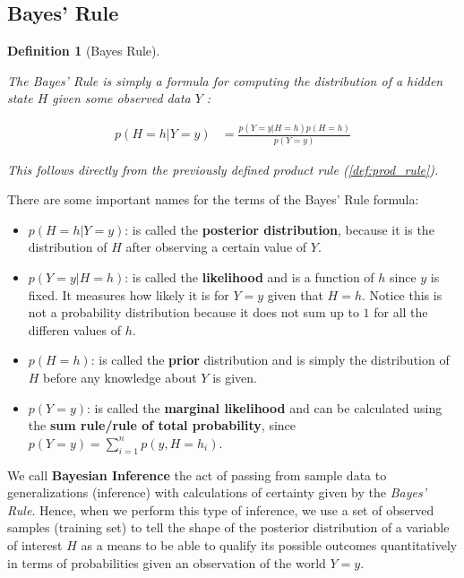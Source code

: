\documentclass{article}
\newtheorem{definition}{Definition}[section]
\begin{document}
\subsection{Bayes' Rule}


\begin{definition}[Bayes Rule]
	\label{def:bayes_rule}
	
	The Bayes' Rule is simply a formula for computing the distribution of a hidden state $H$ given some observed data $Y$ :
	
	\begin{align}
		p(H = h | Y = y) &= \frac{p(Y = y | H = h) p(H = h)}{p(Y=y)}
	\end{align}
	
	This follows directly from the previously defined product rule (\ref{def:prod_rule}).
	
\end{definition}

There are some important names for the terms of the Bayes' Rule formula:

\begin{itemize}
	\item $p(H = h | Y = y)$:  is called the \textbf{posterior distribution}, because it is the distribution of $H$ after observing a certain value of $Y$.
	\item $p(Y = y | H = h)$: is called the \textbf{likelihood} and is a function of $h$ since $y$ is fixed. It measures how likely it is for $Y = y$ given that $H = h$. Notice this is not a probability distribution because it does not sum up to $1$ for all the differen values of $h$.
	\item $p(H = h)$: is called the \textbf{prior} distribution and is simply the distribution of $H$ before any knowledge about $Y$ is given.
	\item $p(Y = y)$: is called the \textbf{marginal likelihood} and can be calculated using the \textbf{sum rule/rule of total probability}, since $p(Y = y) = \sum_{i = 1}^{n} p(y, H = h_i)$.
\end{itemize}


\begin{info} %
	We call \textbf{Bayesian Inference} the act of passing from sample data to generalizations (inference) with calculations of certainty given by the \textit{Bayes' Rule}. Hence, when we perform this type of inference, we use a set of observed samples (training set) to tell the shape of the posterior distribution of a variable of interest $H$ as a means to be able to qualify its possible outcomes quantitatively in terms of probabilities given an observation of the world $Y = y$.
\end{info}
\end{document}
